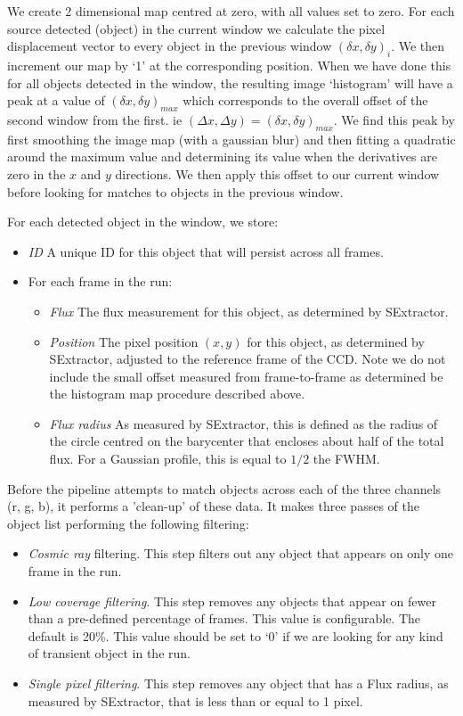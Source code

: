 We create 2 dimensional map centred at zero, with all values set to zero. For each source detected (object) in the current window we calculate the pixel displacement vector to every object in the previous window $(\delta x, \delta y)_i$.  We then increment our map by `1' at the corresponding position. When we have done this for all objects detected in the window, the resulting image `histogram' will have a peak at a value of $(\delta x, \delta y)_{max}$ which corresponds to the overall offset of the second window from the first. ie $(\Delta x, \Delta y) = (\delta x, \delta y)_{max}$. We find this peak by first smoothing the image map (with a gaussian blur) and then fitting a quadratic around the maximum value and determining its value when the derivatives are zero in the $x$ and $y$ directions. We then apply this offset to our current window before looking for matches to objects in the previous window.

For each detected object in the window, we store: 
\begin{itemize}
  \item \emph{ID} A unique ID for this object that will persist across all frames.
  \item For each frame in the run:
  \begin{itemize}
    \item \emph{Flux} The flux measurement for this object, as determined by SExtractor.
    \item \emph{Position} The pixel position $(x, y)$ for this object, as determined by SExtractor, adjusted to the reference frame of the CCD. Note we do not include the small offset measured from frame-to-frame as determined be the histogram map procedure described above. 
    \item \emph{Flux radius} As measured by SExtractor, this is defined as the radius of the circle centred on the barycenter that encloses about half of the total flux. For a Gaussian profile, this is equal to $1/2$ the FWHM. 
  \end{itemize}
\end{itemize}

\label{sect:filtering}
Before the pipeline attempts to match objects across each of the three channels (r, g, b), it performs a 'clean-up' of these data. It makes three passes of the object list performing the following filtering:

\begin{itemize}
  \item \emph{Cosmic ray} filtering. This step filters out any object that appears on only one frame in the run. 
  \item \emph{Low coverage filtering}. This step removes any objects that appear on fewer than a pre-defined percentage of frames. This value is configurable. The default is 20\%. This value should be set to `0' if we are looking for any kind of transient object in the run. 
  \item \emph{Single pixel filtering}. This step removes any object that has a Flux radius, as measured by SExtractor, that is less than or equal to 1 pixel.
\end{itemize}

